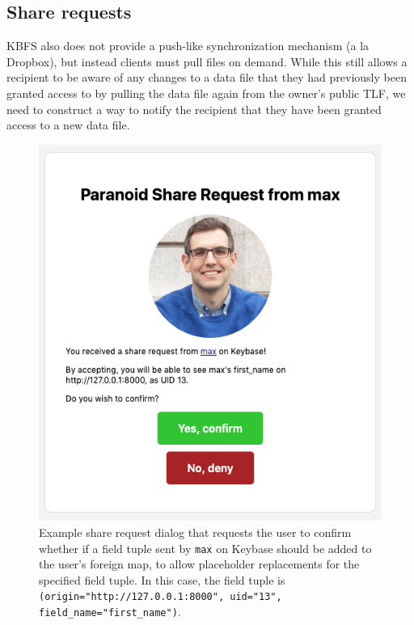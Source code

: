 \documentclass[letterpaper,twocolumn,10pt]{article}
\begin{document}
\subsection{Share requests}

KBFS also does not provide a push-like synchronization mechanism (a la Dropbox), but instead clients must pull files on demand. While this still allows a recipient to be aware of any changes to a data file that they had previously been granted access to by pulling the data file again from the owner's public TLF, we need to construct a way to notify the recipient that they have been granted access to a new data file.

\begin{figure}[]
    \centering
    \includegraphics[width=\columnwidth]{png/share_request.png}
    \caption{Example share request dialog that requests the user to confirm whether if a field tuple sent by \texttt{max} on Keybase should be added to the user's foreign map, to allow placeholder replacements for the specified field tuple. In this case, the field tuple is \texttt{(origin="http://127.0.0.1:8000", uid="13", field\_name="first\_name")}.}
    \label{fig:share_request}
\end{figure}
\end{document}
